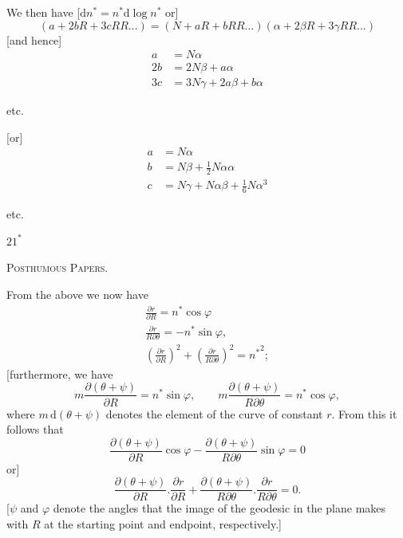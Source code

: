 We then have [$\mathrm dn^*=n^*\mathrm d\log n^*$ or]
\[
(a+2bR+3cRR\ldots)=(N+aR+bRR\ldots)(\alpha+2\beta R+3\gamma RR\ldots)
\]
[and hence]
\[
\begin{aligned}
a&=N\alpha\\
2b&=2N\beta+a\alpha\\
3c&=3N\gamma+2a\beta+b\alpha
\end{aligned}
\]
\begin{center}etc.\end{center}
[or]
\[
\begin{aligned}
a&=N\alpha\\
b&=N\beta+\tfrac12N\alpha\alpha\\
c&=N\gamma+N\alpha\beta+\tfrac16N\alpha^3
\end{aligned}
\]
\begin{center}etc.\end{center}
\vfill\hfill$21^*$\hspace*{2cm}\par
\clearpage
{}\hfill\textsc{Posthumous Papers.}\hfill\mbox{}\par\medskip
\begingroup\small
From the above we now have
\[
\begin{gathered}
\frac{\partial r}{\partial R}=n^*\cos\varphi\\
\frac{\partial r}{R\partial\theta}=-n^*\sin\varphi,\\
\left(\frac{\partial r}{\partial R}\right)^2+\left(\frac{\partial r}{R\partial\theta}\right)^2={n^*}^2;
\end{gathered}
\]
[furthermore, we have
\[
m\frac{\partial(\theta+\psi)}{\partial R}=n^*\sin\varphi,\qquad m\frac{\partial(\theta+\psi)}{R\partial\theta}=n^*\cos\varphi,
\]
where $m\,\mathrm d(\theta+\psi)$ denotes the element of the curve of constant $r$. From this it follows that
\[
\frac{\partial(\theta+\psi)}{\partial R}\cos\varphi-\frac{\partial(\theta+\psi)}{R\partial\theta}\sin\varphi=0
\]
or]
\[
\frac{\partial(\theta+\psi)}{\partial R}.\frac{\partial r}{\partial R}+\frac{\partial(\theta+\psi)}{R\partial\theta}.\frac{\partial r}{R\partial\theta}=0.
\]
[$\psi$ and $\varphi$ denote the angles that the image of the geodesic in the plane makes with $R$ at the starting point and endpoint, respectively.]

